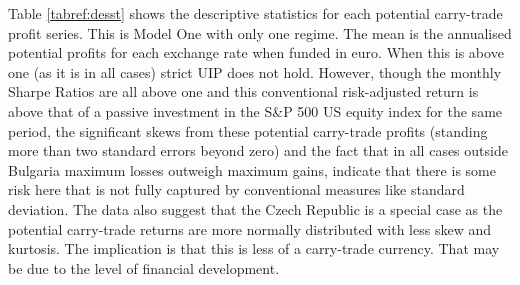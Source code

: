 \documentclass[12pt, a4paper, oneside]{article}\usepackage[]{graphicx}\usepackage[]{color}
\begin{document}
Table \ref{tabref:desst} shows the descriptive statistics for each potential carry-trade profit series. This is Model One with only one regime. The mean is the annualised potential profits for each exchange rate when funded in euro. When this is above one (as it is in all cases) strict UIP does not hold. However, though the monthly Sharpe Ratios are all above one and this conventional risk-adjusted return is above that of a passive investment in the S\&P 500 US equity index for the same period, the significant skews from these potential carry-trade profits (standing more than two standard errors beyond zero) and the fact that in all cases outside Bulgaria maximum losses outweigh maximum gains, indicate that there is some risk here that is not fully captured by conventional measures like standard deviation. The data also suggest that the Czech Republic is a special case as the potential carry-trade returns are more normally distributed with less skew and kurtosis.  The implication is that this is less of a carry-trade currency. That may be due to the level of financial development. 
\end{document}
